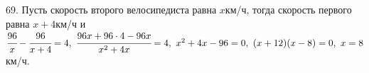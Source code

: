 69. Пусть скорость второго велосипедиста равна $x$км/ч, тогда скорость первого равна $x+4$км/ч и $\cfrac{96}{x}-\cfrac{96}{x+4}=4,\ \cfrac{96x+96\cdot4-96x}{x^2+4x}=4,\ x^2+4x-96=0,\ (x+12)(x-8)=0,\ x=8$км/ч.\\
